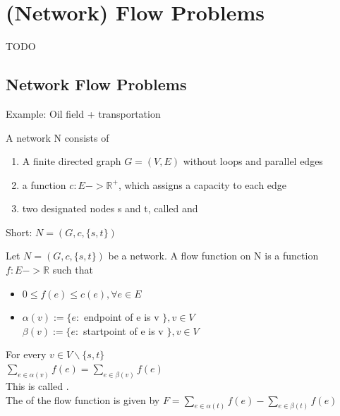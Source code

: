 \chapter{(Network) Flow Problems}

\begin{descr}
    TODO
\end{descr}

\section{Network Flow Problems}
\begin{example}
Example: Oil field + transportation

\end{example}

\begin{definition}
A network N consists of 
\begin{enumerate}
\item A finite directed graph $G=(V,E)$ without loops and parallel edges
\item a function $c: E -> \mathds{R}^{+}$, which assigns a capacity to each edge
\item two designated nodes s and t, called  and 
\end{enumerate}
Short: $N = (G, c, \{s, t\})$
\end{definition}

\begin{definition}
Let $N = (G, c, \{s, t\})$ be a network. A flow function on N is a function $f: E -> \mathds{R}$ such that 
\begin{itemize}
\item $ 0 \le f(e) \le c(e), \forall e \in E $
\item $ \alpha(v) := \{e:$ endpoint of e is v $\}, v \in V$ \\
$\beta(v) := \{e:$ startpoint of e is v $\}, v \in V$
\end{itemize}
For every $v \in V\backslash\{s, t\} $ \\
$ \sum_{e \in \alpha(v)} f(e) = \sum_{e \in \beta(v)} f(e) $ \\
This is called . \\
The  of the flow function is given by $F = \sum_{e \in \alpha(t)} f(e) - \sum_{e \in \beta(t)} f(e) $
\end{definition}

